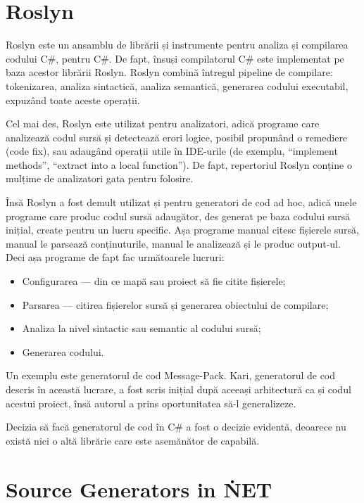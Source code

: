 \documentclass[a4paper,12pt]{report}
\begin{document}
\section{Roslyn}


Roslyn este un ansamblu de librării și instrumente pentru analiza și compilarea codului C\#, pentru C\#.
De fapt, însuși compilatorul C\# este implementat pe baza acestor librării Roslyn.
Roslyn combină întregul pipeline de compilare: tokenizarea, analiza sintactică, analiza semantică, generarea codului executabil, expuzând toate aceste operații.

Cel mai des, Roslyn este utilizat pentru analizatori, adică programe care analizează codul sursă și detectează erori logice, posibil propunând o remediere (code fix), sau adaugând operații utile în IDE-urile (de exemplu, ``implement methods'', ``extract into a local function'').
De fapt, repertoriul Roslyn conține o mulțime de analizatori gata pentru folosire.

Însă Roslyn a fost demult utilizat și pentru generatori de cod ad hoc, adică unele programe care produc codul sursă adaugător, des generat pe baza codului sursă inițial, create pentru un lucru specific.
Așa programe manual citesc fișierele sursă, manual le parsează conținuturile, manual le analizează și le produc output-ul.
Deci așa programe de fapt fac următoarele lucruri:

\begin{itemize}
  \item Configurarea --- din ce mapă sau proiect să fie citite fișierele;
  \item Parsarea --- citirea fișierelor sursă și generarea obiectului de compilare;
  \item Analiza la nivel sintactic sau semantic al codului sursă;
  \item Generarea codului.
\end{itemize}

Un exemplu este generatorul de cod Message-Pack\cite{message_pack_github}.
Kari, generatorul de cod descris în această lucrare, a fost scris inițial după aceeași arhitectură ca și codul acestui proiect, însă autorul a prins oportunitatea să-l generalizeze.

Decizia să facă generatorul de cod în C\# a fost o decizie evidentă, deoarece nu există nici o altă librărie care este asemănător de capabilă.

\section{Source Generators in \. NET}
\end{document}
